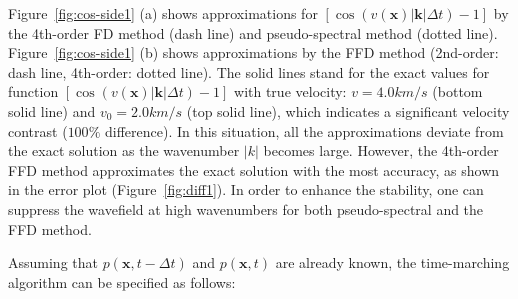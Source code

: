 Figure~\ref{fig:cos-side1} (a) shows approximations for $[\cos(v(\mathbf{x})|\mathbf{k}|\Delta t)-1]$  
by the 4th-order FD method (dash line) and pseudo-spectral method (dotted line). Figure~\ref{fig:cos-side1} (b) shows approximations by the FFD method (2nd-order: dash line, 4th-order: dotted line). 
The solid lines stand for the exact values for function $[\cos(v(\mathbf{x})|\mathbf{k}|\Delta t)-1]$ with true velocity: $v=4.0 km/s$ (bottom solid line) and $v_0=2.0 km/s$ (top solid line), which indicates a significant velocity contrast ($100\%$ difference).
In this situation, all the approximations deviate from the exact solution as the wavenumber $|k|$ becomes large.
However, the 4th-order FFD method approximates the exact solution with the most accuracy, as shown in the error plot (Figure~\ref{fig:diff1}).
In order to enhance the stability, one can suppress the wavefield at high wavenumbers for both pseudo-spectral and the FFD method. \\



Assuming that $p(\mathbf{x},t-\Delta t)$ and $p(\mathbf{x},t)$ are already known, the time-marching algorithm can be specified as follows:

